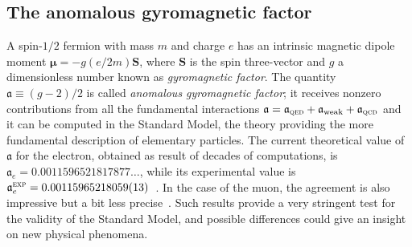 \documentclass[a4paper, 11pt]{article}
\newcommand{\gyr}{\mathfrak{a}}								%
\theoremstyle{thm}
\begin{document}
\subsection{The anomalous gyromagnetic factor}  
A spin-$1/2$ fermion with mass $m$ and charge $e$ has an intrinsic magnetic dipole moment $\bm{\mu} = -g (e/2m) \mathbf{S}$, where $\mathbf{S}$ is the spin three-vector and $g$ a dimensionless number known as \emph{gyromagnetic factor}. The quantity
$\gyr \equiv (g-2)/2$ is called \emph{anomalous gyromagnetic factor}; it receives nonzero contributions from all the fundamental interactions $\gyr = \gyr_{\textsc{qed}} + \gyr_{\textup{weak}} + \gyr_{\textsc{qcd}}$ and it can be computed in the Standard Model, the theory providing the more fundamental description of elementary particles.
The current theoretical value of $\gyr$ for the electron, obtained as result of decades of computations, is $\gyr_e = 0.0011596521817877\dots$, while its experimental value is $\gyr_e^{\textsc{exp}} = 0.00115965218059(13)$~\cite{Aoyama_2012}. In the case of the muon, the agreement is also impressive
but a bit less precise~\cite{Aguillard_2023}. Such results provide a very stringent
test for the validity of the Standard Model, and possible differences could give an insight on new physical phenomena.
\end{document}

